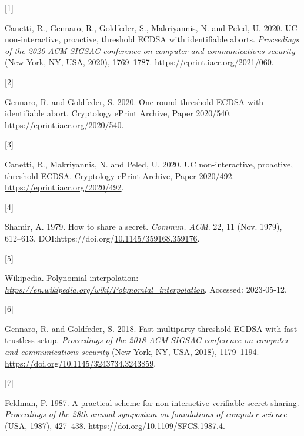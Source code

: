 \documentclass[
]{article}
\newlength{\cslhangindent}
\newlength{\csllabelwidth}
\newlength{\cslentryspacingunit} %
\newenvironment{CSLReferences}[2] %
 {%
  \setlength{\parindent}{0pt}
  \ifodd #1
  \let\oldpar\par
  \def\par{\hangindent=\cslhangindent\oldpar}
  \fi
  \setlength{\parskip}{#2\cslentryspacingunit}
 }%
 {}
\newcommand{\CSLLeftMargin}[1]{\parbox[t]{\csllabelwidth}{#1}}
\newcommand{\CSLRightInline}[1]{\parbox[t]{\linewidth - \csllabelwidth}{#1}\break}
\begin{document}
\hypertarget{refs}{}
\begin{CSLReferences}{0}{0}
\leavevmode{}%
\CSLLeftMargin{{[}1{]} }%
\CSLRightInline{Canetti, R., Gennaro, R., Goldfeder, S., Makriyannis, N.
and Peled, U. 2020. UC non-interactive, proactive, threshold ECDSA with
identifiable aborts. \emph{Proceedings of the 2020 ACM SIGSAC conference
on computer and communications security} (New York, NY, USA, 2020),
1769--1787. \url{https://eprint.iacr.org/2021/060}.}

\leavevmode{}%
\CSLLeftMargin{{[}2{]} }%
\CSLRightInline{Gennaro, R. and Goldfeder, S. 2020. One round threshold
ECDSA with identifiable abort. Cryptology ePrint Archive, Paper
2020/540. \url{https://eprint.iacr.org/2020/540}.}

\leavevmode{}%
\CSLLeftMargin{{[}3{]} }%
\CSLRightInline{Canetti, R., Makriyannis, N. and Peled, U. 2020. UC
non-interactive, proactive, threshold ECDSA. Cryptology ePrint Archive,
Paper 2020/492. \url{https://eprint.iacr.org/2020/492}.}

\leavevmode{}%
\CSLLeftMargin{{[}4{]} }%
\CSLRightInline{Shamir, A. 1979. How to share a secret. \emph{Commun.
ACM}. 22, 11 (Nov. 1979), 612--613.
DOI:https://doi.org/\href{https://doi.org/10.1145/359168.359176}{10.1145/359168.359176}.}

\leavevmode{}%
\CSLLeftMargin{{[}5{]} }%
\CSLRightInline{Wikipedia. Polynomial interpolation:
\href{https://en.wikipedia.org/wiki/Polynomial_interpolation}{\emph{https://en.wikipedia.org/wiki/Polynomial\_interpolation}}.
Accessed: 2023-05-12.}

\leavevmode{}%
\CSLLeftMargin{{[}6{]} }%
\CSLRightInline{Gennaro, R. and Goldfeder, S. 2018. Fast multiparty
threshold ECDSA with fast trustless setup. \emph{Proceedings of the 2018
ACM SIGSAC conference on computer and communications security} (New
York, NY, USA, 2018), 1179--1194.
\url{https://doi.org/10.1145/3243734.3243859}.}

\leavevmode{}%
\CSLLeftMargin{{[}7{]} }%
\CSLRightInline{Feldman, P. 1987. A practical scheme for non-interactive
verifiable secret sharing. \emph{Proceedings of the 28th annual
symposium on foundations of computer science} (USA, 1987), 427--438.
\url{https://doi.org/10.1109/SFCS.1987.4}.}

\end{CSLReferences}
\end{document}
